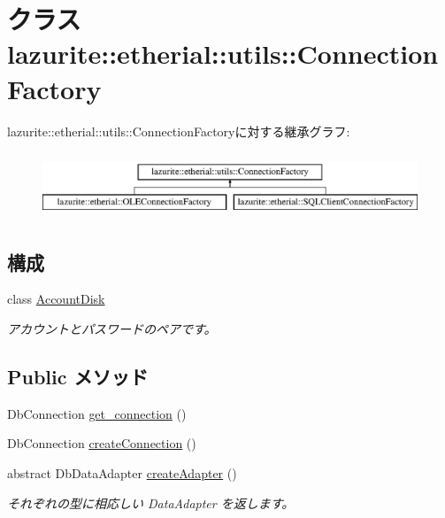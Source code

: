\hypertarget{classlazurite_1_1etherial_1_1utils_1_1_connection_factory}{
\section{クラス lazurite::etherial::utils::ConnectionFactory}
\label{classlazurite_1_1etherial_1_1utils_1_1_connection_factory}
}
lazurite::etherial::utils::ConnectionFactoryに対する継承グラフ:\begin{figure}[H]
\begin{center}
\leavevmode
\includegraphics[height=2cm]{classlazurite_1_1etherial_1_1utils_1_1_connection_factory}
\end{center}
\end{figure}
\subsection*{構成}
\begin{DoxyCompactItemize}
\item 
class \hyperlink{classlazurite_1_1etherial_1_1utils_1_1_connection_factory_1_1_account_disk}{AccountDisk}
\begin{DoxyCompactList}\small\item\em アカウントとパスワードのペアです。 \item\end{DoxyCompactList}\end{DoxyCompactItemize}
\subsection*{Public メソッド}
\begin{DoxyCompactItemize}
\item 
DbConnection \hyperlink{classlazurite_1_1etherial_1_1utils_1_1_connection_factory_ad490aef8cd59c68131fe40a92cd3261b}{get\_\-connection} ()
\item 
DbConnection \hyperlink{classlazurite_1_1etherial_1_1utils_1_1_connection_factory_ac7d1cb0539931cba30efa07cb75045fc}{createConnection} ()
\item 
abstract DbDataAdapter \hyperlink{classlazurite_1_1etherial_1_1utils_1_1_connection_factory_a5980a0a44f55a60cf4b991920d7f8529}{createAdapter} ()
\begin{DoxyCompactList}\small\item\em それぞれの型に相応しい DataAdapter を返します。 \item\end{DoxyCompactList}\end{DoxyCompactItemize}
